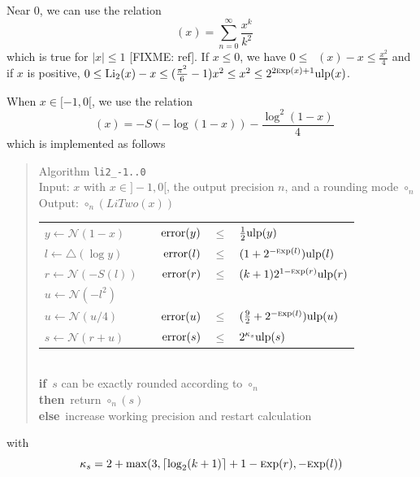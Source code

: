\documentclass[12pt]{amsart}
\DeclareMathOperator{\LiTwo}{Li_2}
\def\n{\textnormal}
\def\pinf{\bigtriangleup}
\def\ulp{{\rm ulp}}
\def\Exp{{\rm \textsc exp}}
\def\N{{\mathcal N}}
\def\If{{\bf if}}
\def\then{{\bf then}}
\def\Else{{\bf else}}
\begin{document}
Near 0, we can use the relation
\[
\LiTwo(x) = \sum_{n=0}^{\infty}\frac{x^k}{k^2}
\]
which is true for $|x| \leq 1$ [FIXME: ref].
If $x \leq 0$, we have $0 \leq \LiTwo(x) - x \leq \frac{x^2}{4}$ 
and if $x$ is positive, 
$0 \leq \LiTwo(x) - x \leq (\frac{\pi^2}{6}-1)x^2 \leq x^2 
\leq 2^{2\Exp(x)+1}\ulp(x)$.

 
When $x \in [-1, 0[$, we use the relation
\[
\LiTwo(x) = - S(-\log(1-x)) - \frac{\log^2(1-x)}{4}
\]
which is implemented as follows
\begin{quote}
Algorithm {\tt li2\_-1..0}\\
Input: $x$ with $x \in ]-1, 0[$, the output precision $n$, and a rounding mode
    $\circ_n$ \\
Output: $\circ_n(LiTwo(x))$ \\
\begin{tabular}{l c r c l}
$y \leftarrow \N(1 - x)$ & &
$\n{error}(y) $ & $ \leq $ & $ \frac{1}{2}\ulp(y)$ \\
$l \leftarrow \pinf(\log y)$ & &
$\n{error}(l) $ & $ \leq $ & $ (1+2^{-\Exp(l)})\ulp(l)$\\
$r \leftarrow \N(-S(l))$ & &
$\n{error}(r) $ & $ \leq $ & $ (k+1)2^{1-\Exp(r)} \ulp(r)$\\

$u \leftarrow \N(-l^2)$ \\
$u \leftarrow \N(u/4)$ & &
$\n{error}(u) $ & $ \leq $ & $(\frac{9}{2} + 2^{-\Exp(l)}) \ulp(u)$\\
$s \leftarrow \N(r + u)$ & &
$\n{error}(s) $ & $ \leq $ & $2^{\kappa_s}\ulp(s)$\\
\end{tabular}\\
\If\ $s$ can be exactly rounded according to $\circ_n$\\
\then\ return $\circ_n(s)$\\
\Else\ increase working precision and restart calculation
\end{quote}
with 
\[
\kappa_s = 2 + {\rm max}(3, \lceil\log_2(k+1)\rceil + 1 - \Exp(r), - \Exp(l))
\]
\end{document}
